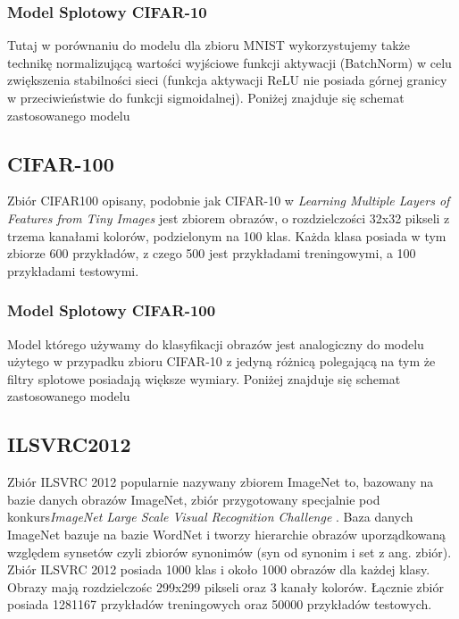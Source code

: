 \documentclass[
    left=2.5cm,         %
    right=2.5cm,        %
    top=2.5cm,          %
    bottom=3cm,         %
    bindingoffset=6mm,  %
    nohyphenation=false %
]{eiti/eiti-thesis}
\begin{document}
        \subsubsection{Model Splotowy CIFAR-10}
        Tutaj w porównaniu do modelu dla zbioru MNIST wykorzystujemy także technikę normalizującą wartości wyjściowe
        funkcji aktywacji (BatchNorm) w celu zwiększenia stabilności sieci (funkcja aktywacji ReLU nie posiada górnej granicy w
        przeciwieństwie do funkcji sigmoidalnej). Poniżej znajduje się schemat zastosowanego modelu

    \subsection{CIFAR-100}
    Zbiór CIFAR100 opisany, podobnie jak CIFAR-10 w  \textit{Learning Multiple Layers of Features from Tiny Images} \cite{Krizhevsky2009LearningML}
    jest zbiorem obrazów, o rozdzielczości 32x32 pikseli z trzema kanałami kolorów, podzielonym na 100 klas.
    Każda klasa posiada w tym zbiorze 600 przykładów, z czego 500 jest przykładami treningowymi, a 100 przykładami testowymi.
        \subsubsection{Model Splotowy CIFAR-100}
        Model którego używamy do klasyfikacji obrazów jest analogiczny do modelu użytego w przypadku zbioru CIFAR-10 z jedyną różnicą polegającą na
        tym że filtry splotowe posiadają większe wymiary. Poniżej znajduje się schemat zastosowanego modelu

    \subsection{ILSVRC2012}\label{ILSVRC2012}
        Zbiór ILSVRC 2012 popularnie nazywany zbiorem ImageNet to, bazowany na bazie danych obrazów ImageNet, zbiór
        przygotowany specjalnie pod konkurs\textit{ImageNet Large Scale Visual Recognition Challenge} \cite{ILSVRC15}.
        Baza danych ImageNet bazuje na bazie WordNet i tworzy hierarchie obrazów uporządkowaną względem synsetów
        czyli zbiorów synonimów (syn od synonim i set z ang. zbiór). Zbiór ILSVRC 2012 posiada 1000 klas i około 1000
        obrazów dla każdej klasy. Obrazy mają rozdzielczośc 299x299 pikseli oraz 3 kanały kolorów. Łącznie zbiór posiada
        1281167 przykładów treningowych oraz 50000 przykładów testowych.
\end{document}
